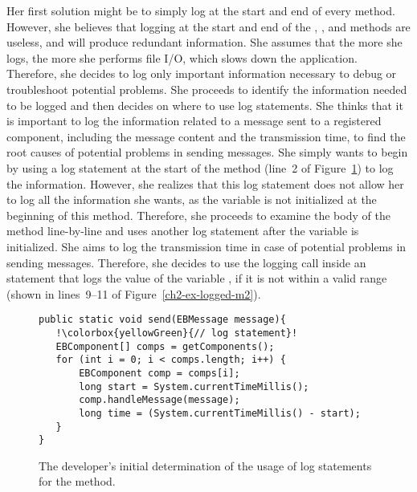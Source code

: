 Her first solution might be to simply log at the start and end of every method. However, she believes that logging at the start and end of the , \-\-, and  methods are useless, and will produce redundant information. She assumes that the more she logs, the more she performs file I/O, which slows down the application. Therefore, she decides to log only important information necessary to debug or troubleshoot potential problems. She proceeds to identify the information needed to be logged and then decides on where to use log statements. She thinks that it is important to log the information related to a message sent to a registered component, including the message content and the transmission time, to find the root causes of potential problems in sending messages. She simply wants to begin by using a log statement at the start of the  method (line~2 of Figure~\ref{ch2-ex-logged-m1}) to log the information. However, she realizes that this log statement does not allow her to log all the information she wants, as the  variable is not initialized at the beginning of this method. Therefore, she proceeds to examine the body of the  method line-by-line and uses another log statement after the  variable is initialized. She aims to log the transmission time in case of potential problems in sending messages. Therefore, she decides to use the logging call inside an  statement that logs the value of the variable , if it is not within a valid range (shown in lines~9--11 of Figure~\ref{ch2-ex-logged-m2}).

\begin{figure}[p]
\def\baselinestretch{1}
\begin{lstlisting}[escapechar=!]
public static void send(EBMessage message){
   !\colorbox{yellowGreen}{// log statement}!
   EBComponent[] comps = getComponents();
   for (int i = 0; i < comps.length; i++) {
       EBComponent comp = comps[i];
       long start = System.currentTimeMillis();
       comp.handleMessage(message);
       long time = (System.currentTimeMillis() - start);
   }
}
\end{lstlisting}
\caption[The developer's initial determination of the usage of logging calls.]{The developer's initial determination of the usage of log statements for the  method.\label{ch2-ex-logged-m1}}
\end{figure}

